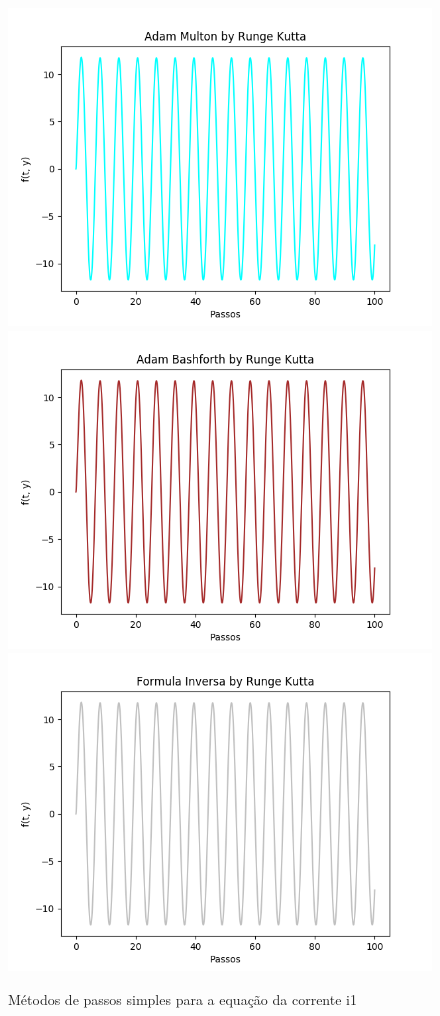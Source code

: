 \documentclass[12pt]{article}%
\begin{document}
    \begin{figure}[H]
        \begin{center}
            \includegraphics[width=.4\textwidth]{problemas/metodos_q3/circuito_multon.png}
            \includegraphics[width=.4\textwidth]{problemas/metodos_q3/circuito_bashforth.png}
            \includegraphics[width=.4\textwidth]{problemas/metodos_q3/circuito_inversa.png}
        \end{center}
        \caption{Métodos de passos simples para a equação da corrente i1}
    \end{figure}
\end{document}
